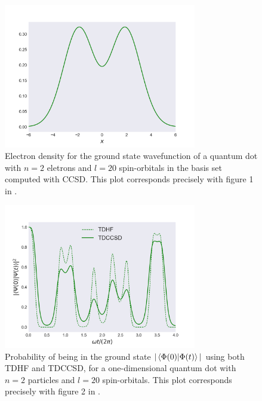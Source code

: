 \begin{figure}
    \centering
    \includegraphics[width=0.75\textwidth]{results/figures/zanghellini_fig1.png}
    \caption{
        \label{fig:zanghellini_fig1}
        Electron density for the ground state wavefunction of a quantum dot with 
        $n=2$ eletrons and $l=20$ spin-orbitals in the basis set computed with
        CCSD. This plot 
        corresponds precisely with figure 1 in
        \citeauthor{Zanghellini04}\cite{Zanghellini04}.
    }
\end{figure}

\begin{figure}
    \centering
    \includegraphics[width=0.75\textwidth]{results/figures/zanghellini_fig2.png}
    \caption{
        \label{fig:zanghellini_fig2}
        Probability of being in the ground state $|\braket{\Phi(0)}{\Phi(t)}|$
        using both TDHF and TDCCSD, for a one-dimensional quantum dot with $n=2$
        particles and $l=20$ spin-orbitals. This plot corresponds precisely with 
        figure 2 in \citeauthor{Zanghellini04}\cite{Zanghellini04}.
    }           
\end{figure}

